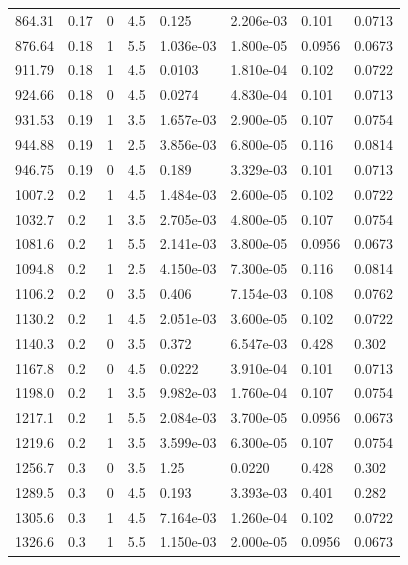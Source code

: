 \documentclass[preview]{standalone}
\begin{document}
{{{\begin{tabular}{L{1.2cm}C{1.2cm} C{0.3cm}C{0.5cm} C{1.4cm}C{1.4cm} C{1.4cm}C{1.4cm}}
  864.31  &  0.17  & 0     & 4.5 &  0.125  & 2.206e-03  & 0.101 &  0.0713   \\ 
  876.64  &  0.18  & 1     & 5.5 &  1.036e-03  & 1.800e-05  & 0.0956 &  0.0673   \\ 
  911.79  &  0.18  & 1     & 4.5 &  0.0103  & 1.810e-04  & 0.102 &  0.0722   \\ 
  924.66  &  0.18  & 0     & 4.5 &  0.0274  & 4.830e-04  & 0.101 &  0.0713   \\ 
  931.53  &  0.19  & 1     & 3.5 &  1.657e-03  & 2.900e-05  & 0.107 &  0.0754   \\ 
  944.88  &  0.19  & 1     & 2.5 &  3.856e-03  & 6.800e-05  & 0.116 &  0.0814   \\ 
  946.75  &  0.19  & 0     & 4.5 &  0.189  & 3.329e-03  & 0.101 &  0.0713   \\ 
  1007.2  &   0.2  & 1     & 4.5 &  1.484e-03  & 2.600e-05  & 0.102 &  0.0722   \\ 
  1032.7  &   0.2  & 1     & 3.5 &  2.705e-03  & 4.800e-05  & 0.107 &  0.0754   \\ 
  1081.6  &   0.2  & 1     & 5.5 &  2.141e-03  & 3.800e-05  & 0.0956 &  0.0673   \\ 
  1094.8  &   0.2  & 1     & 2.5 &  4.150e-03  & 7.300e-05  & 0.116 &  0.0814   \\ 
  1106.2  &   0.2  & 0     & 3.5 &  0.406  & 7.154e-03  & 0.108 &  0.0762   \\ 
  1130.2  &   0.2  & 1     & 4.5 &  2.051e-03  & 3.600e-05  & 0.102 &  0.0722   \\ 
  1140.3  &   0.2  & 0     & 3.5 &  0.372  & 6.547e-03  & 0.428 &  0.302   \\ 
  1167.8  &   0.2  & 0     & 4.5 &  0.0222  & 3.910e-04  & 0.101 &  0.0713   \\ 
  1198.0  &   0.2  & 1     & 3.5 &  9.982e-03  & 1.760e-04  & 0.107 &  0.0754   \\ 
  1217.1  &   0.2  & 1     & 5.5 &  2.084e-03  & 3.700e-05  & 0.0956 &  0.0673   \\ 
  1219.6  &   0.2  & 1     & 3.5 &  3.599e-03  & 6.300e-05  & 0.107 &  0.0754   \\ 
  1256.7  &   0.3  & 0     & 3.5 &  1.25  & 0.0220  & 0.428 &  0.302   \\ 
  1289.5  &   0.3  & 0     & 4.5 &  0.193  & 3.393e-03  & 0.401 &  0.282   \\ 
  1305.6  &   0.3  & 1     & 4.5 &  7.164e-03  & 1.260e-04  & 0.102 &  0.0722   \\ 
  1326.6  &   0.3  & 1     & 5.5 &  1.150e-03  & 2.000e-05  & 0.0956 &  0.0673   \\ 

\end{tabular}}}}
\end{document}
